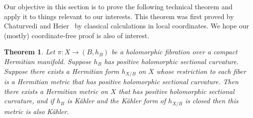 \documentclass[10pt,a4paper]{amsart}
\newtheorem{theo}{Theorem}[section]
\theoremstyle{definition}
\def\kahler{K\"ahler}
\begin{document}
Our objective in this section is to prove the following technical theorem and apply it to things relevant to our interests.
This theorem was first proved by Chaturvedi and Heier~\cite[Theorem~1.1]{chaturvedi2020hermitian} by classical calculations in local coordinates.
We hope our (mostly) coordinate-free proof is also of interest.

\begin{theo}
\label{thm:holomorphic-sectional-positive}
Let $\pi : X \to (B,h_{B})$ be a holomorphic fibration over a compact Hermitian manifold.
Suppose $h_{B}$ has positive holomorphic sectional curvature.
Suppose there exists a Hermitian form $h_{X/B}$ on $X$ whose restriction to each fiber is a Hermitian metric that has positive holomorphic sectional curvature.
Then there exists a Hermitian metric on $X$ that has positive holomorphic sectional curvature, and if $h_{B}$ is \kahler{} and the \kahler{} form of $h_{X/B}$ is closed then this metric is also \kahler{}.
\end{theo}
\end{document}
